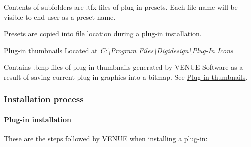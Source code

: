  Contents of subfolders are .tfx files of plug-\/in presets. Each file name will be visible to end user as a preset name.

 Presets are copied into file location during a plug-\/in installation.

 Plug-\/in thumbnails Located at {\itshape C\+:\textbackslash{}Program Files\textbackslash{}Digidesign\textbackslash{}Plug-\/\+In Icons}

 Contains .bmp files of plug-\/in thumbnails generated by V\+E\+N\+U\+E Software as a result of saving current plug-\/in graphics into a bitmap. See \hyperlink{a00377_subsubsection__aax_venue_guide__installer__optional_files__thumbnails}{Plug-\/in thumbnails}.

\hypertarget{a00377_subsection__aax_venue_guide__system_details__plugin_installation}{}\subsubsection{Installation process}\label{a00377_subsection__aax_venue_guide__system_details__plugin_installation}
 \hypertarget{a00377_subsubsection__aax_venue_guide__system_details__plugin_installation__install}{}\paragraph{Plug-\/in installation}\label{a00377_subsubsection__aax_venue_guide__system_details__plugin_installation__install}
 These are the steps followed by V\+E\+N\+U\+E when installing a plug-\/in\+: 
